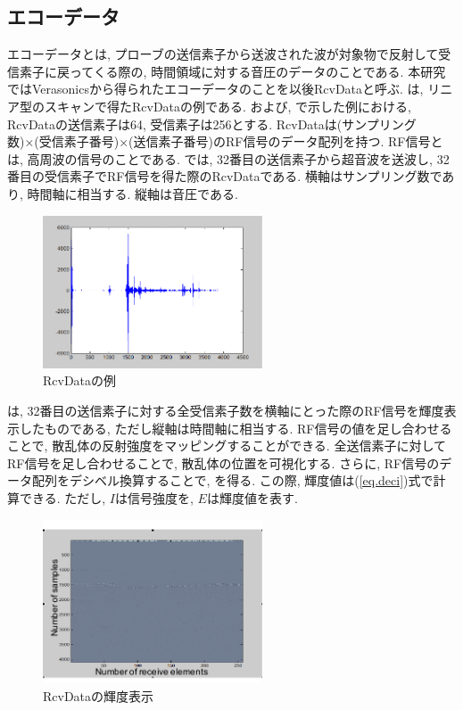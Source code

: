 \subsection{エコーデータ\label{echodata}}
エコーデータとは, プローブの送信素子から送波された波が対象物で反射して受信素子に戻ってくる際の, 時間領域に対する音圧のデータのことである. 本研究ではVerasonicsから得られたエコーデータのことを以後RcvDataと呼ぶ. は, リニア型のスキャンで得たRcvDataの例である. および, で示した例における, RcvDataの送信素子は64, 受信素子は256とする. RcvDataは(サンプリング数)×(受信素子番号)×(送信素子番号)のRF信号のデータ配列を持つ. RF信号とは, 高周波の信号のことである. では, 32番目の送信素子から超音波を送波し, 32番目の受信素子でRF信号を得た際のRcvDataである. 横軸はサンプリング数であり, 時間軸に相当する. 縦軸は音圧である. 
\begin{figure}[H]
  \begin{center}
    \includegraphics[width=65mm]{fig/RcvData_32.pdf}
  \end{center}
  \caption{RcvDataの例}
\end{figure}
は, 32番目の送信素子に対する全受信素子数を横軸にとった際のRF信号を輝度表示したものである, ただし縦軸は時間軸に相当する. RF信号の値を足し合わせることで, 散乱体の反射強度をマッピングすることができる. 全送信素子に対してRF信号を足し合わせることで, 散乱体の位置を可視化する. さらに, RF信号のデータ配列をデシベル換算することで, を得る. この際, 輝度値は(\ref{eq.deci})式で計算できる. ただし, $I$は信号強度を, $E$は輝度値を表す. 
\begin{figure}[h]
  \begin{center}
    \includegraphics[width=65mm]{fig/RcvData_light.pdf}
  \end{center}
  \caption{RcvDataの輝度表示}
\end{figure}
